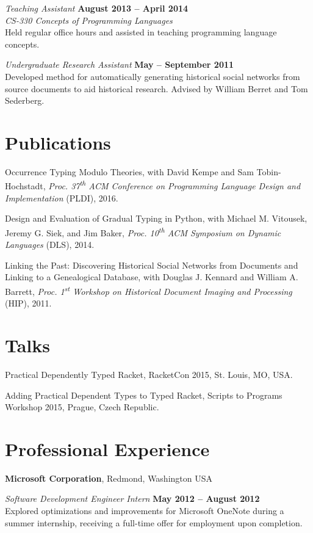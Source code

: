 \documentclass[margin,line]{res}
\newcommand{\ts}{\textsuperscript}
\begin{document}
\begin{resume}
{\em Teaching Assistant} \hfill {\bf August 2013 -- April 2014}\\ {\em
  CS-330 Concepts of Programming Languages}\\ Held regular office hours
and assisted in teaching programming language concepts.


{\em Undergraduate Research Assistant} \hfill {\bf May -- September
  2011}\\ Developed method for automatically generating historical
social networks from source documents to aid historical
research. Advised by William Berret and Tom Sederberg.


\section{\sc Publications}

Occurrence Typing Modulo Theories, with David Kempe and Sam
Tobin-Hochstadt, {\em Proc. 37\ts{th} ACM Conference on Programming 
Language Design and Implementation} (PLDI), 2016.

Design and Evaluation of Gradual Typing in Python, with Michael
M. Vitousek, Jeremy G. Siek, and Jim Baker, {\em Proc.  10\ts{th} ACM
  Symposium on Dynamic Languages} (DLS), 2014.

Linking the Past: Discovering Historical Social Networks from
Documents and Linking to a Genealogical Database, with Douglas
J. Kennard and William A. Barrett, {\em Proc. 1\ts{st} Workshop on
  Historical Document Imaging and Processing} (HIP), 2011.

\section{\sc Talks}
Practical Dependently Typed Racket, RacketCon 2015, St. Louis, MO, USA.

Adding Practical Dependent Types to Typed Racket, Scripts to Programs Workshop 2015, Prague, Czech Republic.

\section{\sc Professional Experience}
{\bf Microsoft Corporation}, Redmond, Washington USA

\vspace{-.3cm}
{\em Software Development Engineer Intern} \hfill {\bf May 2012 -- August 2012}\\
Explored optimizations and improvements for Microsoft OneNote during a
summer internship, receiving a full-time offer for employment upon completion.


\end{resume}
\end{document}
